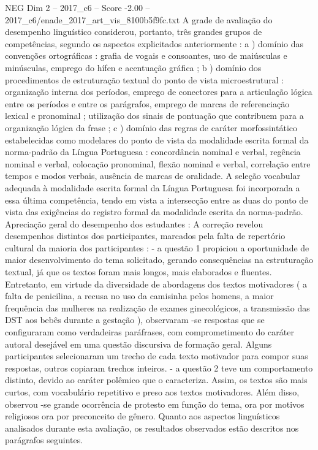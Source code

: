 \begin{textsample}{NEG Dim 2 – 2017\_c6 – Score -2.00 – 2017\_c6/enade\_2017\_art\_vis\_8100b5f9fc.txt}
A grade de avaliação do desempenho linguístico considerou, portanto, três grandes grupos de competências, segundo os aspectos explicitados anteriormente : a ) domínio das convenções ortográficas : grafia de vogais e consoantes, uso de maiúsculas e minúsculas, emprego do hífen e acentuação gráfica ; b ) domínio dos procedimentos de estruturação textual do ponto de vista microestrutural : organização interna dos períodos, emprego de conectores para a articulação lógica entre os períodos e entre os parágrafos, emprego de marcas de referenciação lexical e pronominal ; utilização dos sinais de pontuação que contribuem para a organização lógica da frase ; c ) domínio das regras de caráter morfossintático estabelecidas como modelares do ponto de vista da modalidade escrita formal da norma-padrão da Língua Portuguesa : concordância nominal e verbal, regência nominal e verbal, colocação pronominal, flexão nominal e verbal, correlação entre tempos e modos verbais, ausência de marcas de oralidade.
A seleção vocabular adequada à modalidade escrita formal da Língua Portuguesa foi incorporada a essa última competência, tendo em vista a intersecção entre as duas do ponto de vista das exigências do registro formal da modalidade escrita da norma-padrão.
Apreciação geral do desempenho dos estudantes : A correção revelou desempenhos distintos dos participantes, marcados pela falta de repertório cultural da maioria dos participantes : - a questão 1 propiciou a oportunidade de maior desenvolvimento do tema solicitado, gerando consequências na estruturação textual, já que os textos foram mais longos, mais elaborados e fluentes.
Entretanto, em virtude da diversidade de abordagens dos textos motivadores ( a falta de penicilina, a recusa no uso da camisinha pelos homens, a maior frequência das mulheres na realização de exames ginecológicos, a transmissão das DST aos bebês durante a gestação ), observaram -se respostas que se configuraram como verdadeiras paráfrases, com comprometimento do caráter autoral desejável em uma questão discursiva de formação geral.
Alguns participantes selecionaram um trecho de cada texto motivador para compor suas respostas, outros copiaram trechos inteiros. - a questão 2 teve um comportamento distinto, devido ao caráter polêmico que o caracteriza.
Assim, os textos são mais curtos, com vocabulário repetitivo e preso aos textos motivadores.
Além disso, observou -se grande ocorrência de protesto em função do tema, ora por motivos religiosos ora por preconceito de gênero.
Quanto aos aspectos linguísticos analisados durante esta avaliação, os resultados observados estão descritos nos parágrafos seguintes.

\end{textsample}
